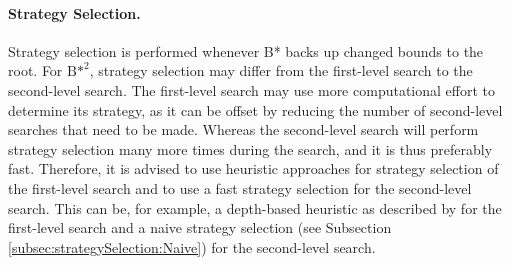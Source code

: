 \paragraph{Strategy Selection.}
Strategy selection is performed whenever B* backs up changed bounds to the root. For ${\text{B*}}^2$, strategy selection may differ from the first-level search to the second-level search. The first-level search may use more computational effort to determine its strategy, as it can be offset by reducing the number of second-level searches that need to be made. Whereas the second-level search will perform strategy selection many more times during the search, and it is thus preferably fast. Therefore, it is advised to use heuristic approaches for strategy selection of the first-level search and to use a fast strategy selection for the second-level search. This can be, for example, a depth-based heuristic as described by  for the first-level search and a naive strategy selection (see Subsection \ref{subsec:strategySelection:Naive}) for the second-level search.


